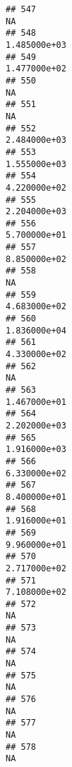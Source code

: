 \documentclass[
]{article}
\begin{document}
\begin{verbatim}
## 547                                                                         NA
## 548                                                               1.485000e+03
## 549                                                               1.477000e+02
## 550                                                                         NA
## 551                                                                         NA
## 552                                                               2.484000e+03
## 553                                                               1.555000e+03
## 554                                                               4.220000e+02
## 555                                                               2.204000e+03
## 556                                                               5.700000e+01
## 557                                                               8.850000e+02
## 558                                                                         NA
## 559                                                               4.683000e+02
## 560                                                               1.836000e+04
## 561                                                               4.330000e+02
## 562                                                                         NA
## 563                                                               1.467000e+01
## 564                                                               2.202000e+03
## 565                                                               1.916000e+03
## 566                                                               6.330000e+02
## 567                                                               8.400000e+01
## 568                                                               1.916000e+01
## 569                                                               9.960000e+01
## 570                                                               2.717000e+02
## 571                                                               7.108000e+02
## 572                                                                         NA
## 573                                                                         NA
## 574                                                                         NA
## 575                                                                         NA
## 576                                                                         NA
## 577                                                                         NA
## 578                                                                         NA

\end{verbatim}
\end{document}
